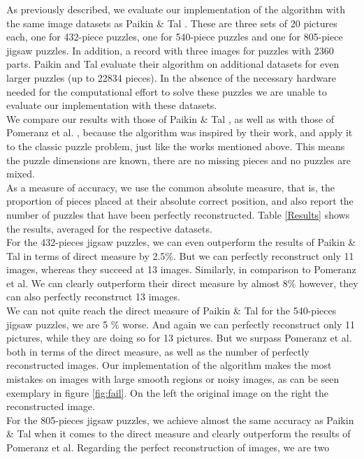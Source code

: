 \documentclass[11pt]{report}
\begin{document}
As previously described, we evaluate our implementation of the algorithm with
the same image datasets as Paikin \& Tal \cite{Paikin2015}. These are three sets
of 20 pictures each, one for 432-piece puzzles, one for 540-piece puzzles and
one for 805-piece jigsaw puzzles. In addition, a record with three images for
puzzles with 2360 parts. Paikin and Tal evaluate their algorithm on additional
datasets for even larger puzzles (up to 22834 pieces). In the absence of the
necessary hardware needed for the computational effort to solve these puzzles we
are unable to evaluate our implementation with these datasets. \\
We compare our
results with those of Paikin \& Tal \cite{Paikin2015}, as well as with those of
Pomeranz et al. \cite{Pomeranz2011}, because the algorithm was inspired by their
work, and apply it to the classic puzzle problem, just like the works mentioned
above. This means the puzzle dimensions are known, there are no missing pieces
and no puzzles are mixed. \\
As a measure of accuracy, we use the common absolute measure, that is, the
proportion of pieces placed at their absolute correct position, and also report
the number of puzzles that have been perfectly reconstructed. Table
\ref{Results} shows the results, averaged for the respective datasets. \\
For the 432-pieces jigsaw puzzles, we can even outperform the results of Paikin \& Tal in
terms of direct measure by 2.5\%. But we can perfectly reconstruct only 11 images,
whereas they succeed at 13 images. Similarly, in comparison to Pomeranz et
al. We can clearly outperform their direct measure by almost 8\% however, they
can also perfectly reconstruct 13 images. \\
We can not quite reach the direct measure of Paikin \& Tal for the 540-pieces
jigsaw puzzles, we are 5 \% worse. And again we can perfectly reconstruct only 11
pictures, while they are doing so for 13 pictures. But we surpass Pomeranz et
al. both in terms of the direct measure, as well as the number of perfectly
reconstructed images. Our implementation of the algorithm makes the most
mistakes on images with large smooth regions or noisy images, as can be seen
exemplary in figure \ref{fig:fail}. On the left the original image on the right
the reconstructed image. \\
For the 805-pieces jigsaw puzzles, we achieve almost the same accuracy as Paikin
\& Tal when it comes to the direct measure and clearly outperform the results
of Pomeranz et al. Regarding the perfect reconstruction of images, we are two
\end{document}
